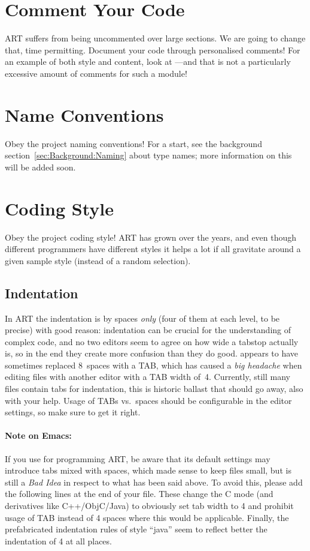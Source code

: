 \section{Comment Your Code}

ART suffers from being uncommented over large sections. We
are going to change that, time permitting. Document your code through personalised comments! For an example of both
  style and content, look at
  ---and that is not a
  particularly excessive amount of comments for such a module!

  
\section{Name Conventions}
 Obey the project naming conventions! For a start, see the
  background section~\ref{sec:Background:Naming} about type names;
  more information on this will be added soon.

  
\section{Coding Style}

Obey the project coding style! ART has grown over the years, and even
though different programmers have different styles it helps a lot if
all gravitate around a given sample style (instead of a random
selection).

\subsection{Indentation}
In ART the indentation is by spaces \emph{only} (four of them at each
level, to be precise) with good reason: indentation can be crucial for
the understanding of complex code, and no two editors seem to agree on
how wide a tabstop actually is, so in the end they create more
confusion than they do good.  appears to have sometimes
replaced 8~spaces with a TAB, which has caused a \emph{big headache}
when editing  files with another editor with a TAB
width of~4. Currently, still many files contain tabs for indentation,
this is historic ballast that should go away, also with your help.
Usage of TABs vs.\ spaces should be configurable in the editor
settings, so make sure to get it right.

\paragraph{Note on Emacs:}
If you use  for programming ART, be aware that its
default settings may introduce tabs mixed with spaces, which made
sense to keep files small, but is still a \emph{Bad
  Idea\texttrademark{}} in respect to what has been said above.  To
avoid this, please add the following lines at the end of your
 file.  These change the C mode
(and derivatives like C++/ObjC/Java) to obviously set tab width to 4
and prohibit usage of TAB instead of 4 spaces where this would be
applicable. Finally, the prefabricated indentation rules of style
``java'' seem to reflect better the indentation of 4 at all places.

